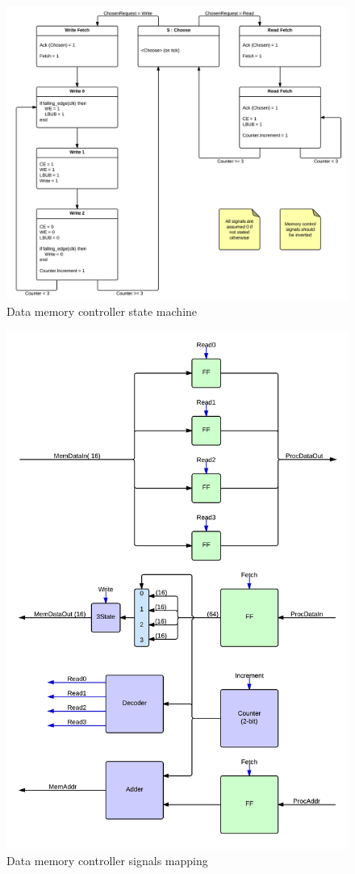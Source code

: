\begin{figure}[H]
  \centering
  \includegraphics[width=\textwidth]{fpga/fig/memory_ctrl_state_machine.png}
  \caption{Data memory controller state machine}
  \label{fpga:fig:mem:data_memory_ctrl_state_machine}
\end{figure}


\begin{figure}[H]
  \centering
  \includegraphics[width=\textwidth]{fpga/fig/memory_ctrl.png}
  \caption{Data memory controller signals mapping}
  \label{fpga:fig:mem:data_memory_ctrl}
\end{figure}

